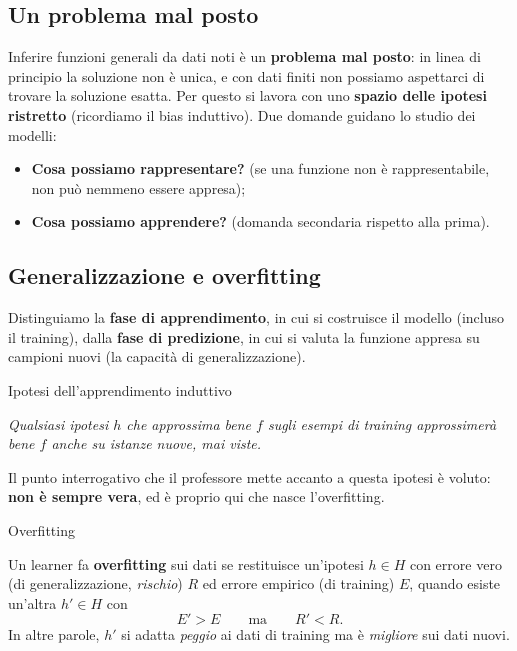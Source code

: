 \subsection{Un problema mal posto}\label{un-problema-mal-posto}

Inferire funzioni generali da dati noti è un \textbf{problema mal
posto}: in linea di principio la soluzione non è unica, e con dati
finiti non possiamo aspettarci di trovare la soluzione esatta. Per
questo si lavora con uno \textbf{spazio delle ipotesi ristretto}
(ricordiamo il bias induttivo). Due domande guidano lo studio dei
modelli:

\begin{itemize}
\tightlist
\item
  \textbf{Cosa possiamo rappresentare?} (se una funzione non è
  rappresentabile, non può nemmeno essere appresa);
\item
  \textbf{Cosa possiamo apprendere?} (domanda secondaria rispetto alla
  prima).
\end{itemize}

\subsection{Generalizzazione e
overfitting}\label{generalizzazione-e-overfitting}

Distinguiamo la \textbf{fase di apprendimento}, in cui si costruisce il
modello (incluso il training), dalla \textbf{fase di predizione}, in cui
si valuta la funzione appresa su campioni nuovi (la capacità di
generalizzazione).

\begin{boxdefinition}{Ipotesi dell'apprendimento induttivo}

\emph{Qualsiasi ipotesi \(h\) che approssima bene \(f\) sugli esempi di
training approssimerà bene \(f\) anche su istanze nuove, mai viste.}

\end{boxdefinition}

Il punto interrogativo che il professore mette accanto a questa ipotesi
è voluto: \textbf{non è sempre vera}, ed è proprio qui che nasce
l'overfitting.

\begin{boxdefinition}{Overfitting}

Un learner fa \textbf{overfitting} sui dati se restituisce un'ipotesi
\(h \in H\) con errore vero (di generalizzazione, \emph{rischio}) \(R\)
ed errore empirico (di training) \(E\), quando esiste un'altra
\(h' \in H\) con \[
E' > E \qquad \text{ma} \qquad R' < R.
\] In altre parole, \(h'\) si adatta \emph{peggio} ai dati di training
ma è \emph{migliore} sui dati nuovi.

\end{boxdefinition}

